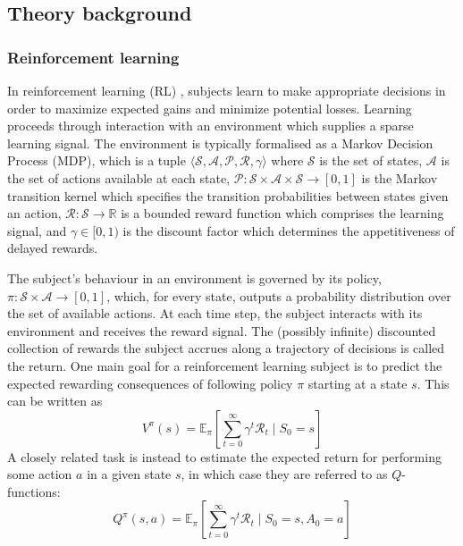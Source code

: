 \subsection*{Theory background}

\subsubsection*{Reinforcement learning}
In reinforcement learning (RL) \parencite{suttonReinforcementLearningIntroduction2018}, subjects learn to make appropriate decisions in order to maximize expected gains and minimize potential losses.  Learning proceeds through interaction with an environment which supplies a sparse learning signal. The environment is typically formalised as a Markov Decision Process (MDP), which is a tuple $\langle \mathcal{S}, \mathcal{A}, \mathcal{P}, \mathcal{R}, \gamma \rangle$ where $\mathcal{S}$ is the set of states, $\mathcal{A}$ is the set of actions available at each state, $\mathcal{P}: \mathcal{S} \times \mathcal{A} \times \mathcal{S} \rightarrow [0, 1]$ is the Markov transition kernel which specifies the transition probabilities between states given an action, $\mathcal{R}:\mathcal{S}\rightarrow \mathbb{R}$ is a bounded reward function which comprises the learning signal, and $\gamma \in [0, 1)$ is the discount factor which determines the appetitiveness of delayed rewards.

The subject's behaviour in an environment is governed by its policy,  $\pi:\mathcal{S} \times \mathcal{A} \rightarrow [0,1]$, which, for every state, outputs a probability distribution over the set of available actions. At each time step, the subject interacts with its environment and receives the reward signal. The (possibly infinite) discounted collection of rewards the subject accrues along a trajectory of decisions is called the return. One main goal for a reinforcement learning subject
is  to predict the expected rewarding consequences of following  policy $\pi$ starting at a state $s$. This can be written as
\begin{equation}
    V^{\pi}(s) = \mathbb{E}_{\pi}\left[ \sum_{t=0}^{\infty} \gamma^t \mathcal{R}_t \mid S_0 = s \right]
    \label{eqn:value}
\end{equation}
A closely related task is instead to estimate the expected return for performing some action $a$ in a given state $s$, in which case they are referred to as  $Q$-functions:
\begin{equation}
    Q^\pi(s, a) = \mathbb{E}_{\pi}\left[ \sum_{t=0}^{\infty} \gamma^t \mathcal{R}_t \mid S_0 = s, A_0 = a \right]
    \label{eqn:qvalue}
\end{equation}

